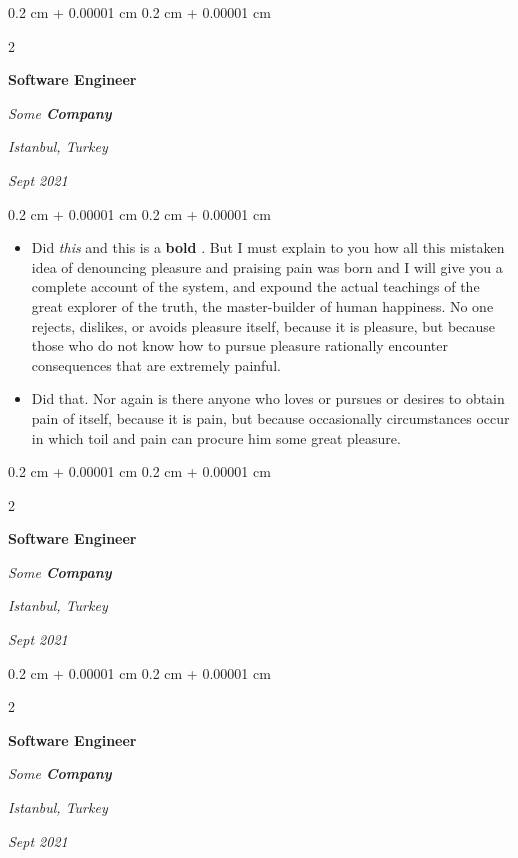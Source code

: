 \documentclass[10pt, letterpaper]{article}
\newenvironment{highlights}{
    \begin{itemize}[
        topsep=0.10 cm,
        parsep=0.10 cm,
        partopsep=0pt,
        itemsep=0pt,
        leftmargin=0.4 cm + 10pt
    ]
}{
    \end{itemize}
} %
\newenvironment{onecolentry}{
    \begin{adjustwidth}{
        0.2 cm + 0.00001 cm
    }{
        0.2 cm + 0.00001 cm
    }
}{
    \end{adjustwidth}
} %
\newenvironment{twocolentry}[2][]{
    \onecolentry
    \def\secondColumn{#2}
    \setcolumnwidth{\fill, 4.5 cm}
    \begin{paracol}{2}
}{
    \switchcolumn \raggedleft \secondColumn
    \end{paracol}
    \endonecolentry
} %
\let\hrefWithoutArrow\href
\renewcommand{\href}[2]{\hrefWithoutArrow{#1}{\ifthenelse{\equal{#2}{}}{ }{#2 }\raisebox{.15ex}{\footnotesize \faExternalLink*}}}
\begin{document}
        \vspace{0.2 cm}

        \begin{twocolentry}{
        \textit{Istanbul, Turkey}    
            
        \textit{Sept 2021}}
            \textbf{Software Engineer}
            
            \textit{Some \textbf{Company}}
        \end{twocolentry}

        \vspace{0.10 cm}
        \begin{onecolentry}
            \begin{highlights}
                \item Did \textit{this} and this is a \textbf{bold} \href{https://example.com}{link}. But I must explain to you how all this mistaken idea of denouncing pleasure and praising pain was born and I will give you a complete account of the system, and expound the actual teachings of the great explorer of the truth, the master-builder of human happiness. No one rejects, dislikes, or avoids pleasure itself, because it is pleasure, but because those who do not know how to pursue pleasure rationally encounter consequences that are extremely painful.
                \item Did that. Nor again is there anyone who loves or pursues or desires to obtain pain of itself, because it is pain, but because occasionally circumstances occur in which toil and pain can procure him some great pleasure.
            \end{highlights}
        \end{onecolentry}


        \vspace{0.2 cm}

        \begin{twocolentry}{
        \textit{Istanbul, Turkey}    
            
        \textit{Sept 2021}}
            \textbf{Software Engineer}
            
            \textit{Some \textbf{Company}}
        \end{twocolentry}



        \vspace{0.2 cm}

        \begin{twocolentry}{
        \textit{Istanbul, Turkey}    
            
        \textit{Sept 2021}}
            \textbf{Software Engineer}
            
            \textit{Some \textbf{Company}}
        \end{twocolentry}
\end{document}
